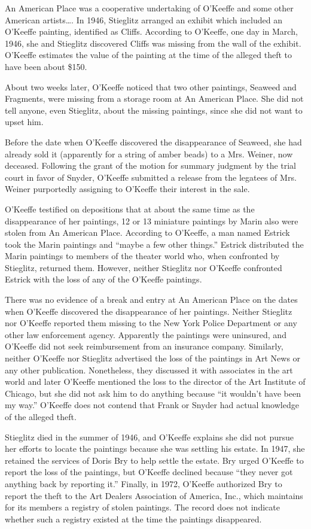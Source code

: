 An American Place was a cooperative undertaking of O'Keeffe and some other
American artists\ldots. In 1946, Stieglitz arranged an exhibit which included
an O'Keeffe painting, identified as Cliffs. According to O'Keeffe, one day in
March, 1946, she and Stieglitz discovered Cliffs was missing from the wall of
the exhibit. O'Keeffe estimates the value of the painting at the time of the
alleged theft to have been about \$150.

About two weeks later, O'Keeffe noticed that two other paintings, Seaweed and
Fragments, were missing from a storage room at An American Place. She did not
tell anyone, even Stieglitz, about the missing paintings, since she did not
want to upset him.

Before the date when O'Keeffe discovered the disappearance of Seaweed, she had
already sold it (apparently for a string of amber beads) to a Mrs. Weiner, now
deceased. Following the grant of the motion for summary judgment by the trial
court in favor of Snyder, O'Keeffe submitted a release from the legatees of
Mrs. Weiner purportedly assigning to O'Keeffe their interest in the sale.

O'Keeffe testified on depositions that at about the same time as the
disappearance of her paintings, 12 or 13 miniature paintings by Marin also were
stolen from An American Place. According to O'Keeffe, a man named Estrick took
the Marin paintings and ``maybe a few other things.'' Estrick distributed the
Marin paintings to members of the theater world who, when confronted by
Stieglitz, returned them. However, neither Stieglitz nor O'Keeffe confronted
Estrick with the loss of any of the O'Keeffe paintings.

There was no evidence of a break and entry at An American Place on the dates
when O'Keeffe discovered the disappearance of her paintings. Neither Stieglitz
nor O'Keeffe reported them missing to the New York Police Department or any
other law enforcement agency. Apparently the paintings were uninsured, and
O'Keeffe did not seek reimbursement from an insurance company. Similarly,
neither O'Keeffe nor Stieglitz advertised the loss of the paintings in Art News
or any other publication. Nonetheless, they discussed it with associates in the
art world and later O'Keeffe mentioned the loss to the director of the Art
Institute of Chicago, but she did not ask him to do anything because ``it
wouldn't have been my way.'' O'Keeffe does not contend that Frank or Snyder had
actual knowledge of the alleged theft.

Stieglitz died in the summer of 1946, and O'Keeffe explains she did not pursue
her efforts to locate the paintings because she was settling his estate. In
1947, she retained the services of Doris Bry to help settle the estate. Bry
urged O'Keeffe to report the loss of the paintings, but O'Keeffe declined
because ``they never got anything back by reporting it.'' Finally, in 1972,
O'Keeffe authorized Bry to report the theft to the Art Dealers Association of
America, Inc., which maintains for its members a registry of stolen paintings.
The record does not indicate whether such a registry existed at the time the
paintings disappeared.

